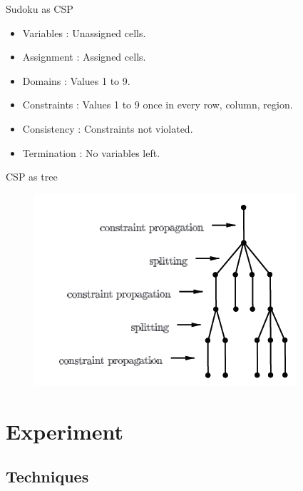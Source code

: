 \documentclass{beamer}
\begin{document}
\begin{frame}{Sudoku as CSP}

  \begin{itemize}
  \item
    Variables   : Unassigned cells.
  \item
    Assignment  : Assigned cells.
  \item
    Domains     : Values 1 to 9.
  \item
    Constraints : Values 1 to 9 once in every row, column, region.
  \item
    Consistency : Constraints not violated.
  \item
    Termination : No variables left.
  \end{itemize}
\end{frame}

\begin{frame}{CSP as tree}

\begin{figure}[htbp]

\begin{center}
\includegraphics{tree.png}
\end{center}

\end{figure}

\end{frame}

\section{Experiment}
\subsection[Techniques]{Techniques}

\begin{frame}
\begin{center}
\structure{\Huge \insertsubsection}
\end{center}
\end{frame}
\end{document}
